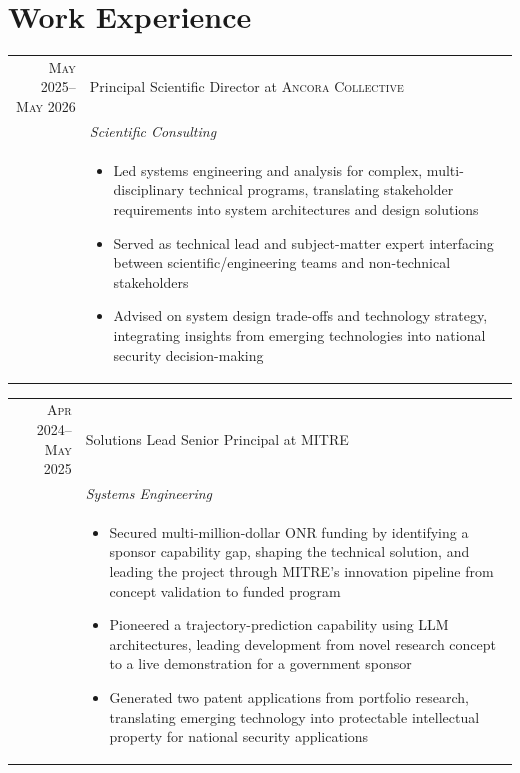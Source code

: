 \documentclass[letterpaper,12pt]{article}
\begin{document}
\section{Work Experience}
\begin{tabular}{rp{13cm}}
    \textsc{May 2025}--\textsc{May 2026} & Principal Scientific Director at \textsc{Ancora Collective}  \\  
    & \emph{Scientific Consulting} \\   
    & \footnotesize{ 
        \begin{itemize}[topsep=0pt,itemsep=0pt,partopsep=0pt,parsep=0pt]
            \vspace{-0.2cm}
            \item Led systems engineering and analysis for complex, multi-disciplinary technical programs, translating stakeholder requirements into system architectures and design solutions
            \item Served as technical lead and subject-matter expert interfacing between scientific/engineering teams and non-technical stakeholders
            \item Advised on system design trade-offs and technology strategy, integrating insights from emerging technologies into national security decision-making
    \end{itemize}}\\
\end{tabular}

\begin{tabular}{rp{13cm}}
    \textsc{Apr 2024}--\textsc{May 2025} & Solutions Lead Senior Principal at \textsc{MITRE}  \\  
    & \emph{Systems Engineering} \\   
    & \footnotesize{ 
        \begin{itemize}[topsep=0pt,itemsep=0pt,partopsep=0pt,parsep=0pt]
            \vspace{-0.2cm}
			\item Secured multi-million-dollar ONR funding by identifying a sponsor capability gap, shaping the technical solution, and leading the project through MITRE's innovation pipeline from concept validation to funded program
            \item Pioneered a trajectory-prediction capability using LLM architectures, leading development from novel research concept to a live demonstration for a government sponsor
            \item Generated two patent applications from portfolio research, translating emerging technology into protectable intellectual property for national security applications
    \end{itemize}}\\
\end{tabular}
\end{document}
